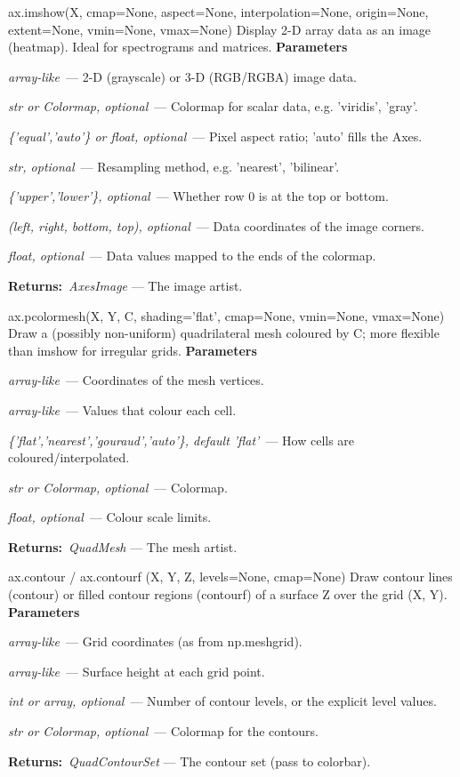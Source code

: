 \documentclass[10pt]{article}
\newenvironment{params}
  {\smallskip\textbf{\small\color{accent}Parameters}\par\nopagebreak
   \begin{description}[leftmargin=1.3em,itemsep=1.5pt,parsep=0pt,topsep=1pt,
      labelindent=0pt,style=sameline,font=\normalfont]}
  {\end{description}}
\newcommand{\pitem}[3]{\item[{\ttfamily\color{accent}#1}]{\itshape #2}\ --- #3}
\newcommand{\preturn}[2]{\smallskip\textbf{\small\color{accent}Returns:}\ {\itshape #1} --- #2\par}
\begin{document}
\begin{func}{ax.imshow(X, cmap=None, aspect=None, interpolation=None, origin=None, extent=None, vmin=None, vmax=None)}
Display 2-D array data as an image (heatmap). Ideal for spectrograms and matrices.
\begin{params}
\pitem{X}{array-like}{2-D (grayscale) or 3-D (RGB/RGBA) image data.}
\pitem{cmap}{str or Colormap, optional}{Colormap for scalar data, e.g. 'viridis', 'gray'.}
\pitem{aspect}{\{'equal','auto'\} or float, optional}{Pixel aspect ratio; 'auto' fills the Axes.}
\pitem{interpolation}{str, optional}{Resampling method, e.g. 'nearest', 'bilinear'.}
\pitem{origin}{\{'upper','lower'\}, optional}{Whether row 0 is at the top or bottom.}
\pitem{extent}{(left, right, bottom, top), optional}{Data coordinates of the image corners.}
\pitem{vmin, vmax}{float, optional}{Data values mapped to the ends of the colormap.}
\end{params}
\preturn{AxesImage}{The image artist.}
\end{func}
\medskip

\begin{func}{ax.pcolormesh(X, Y, C, shading='flat', cmap=None, vmin=None, vmax=None)}
Draw a (possibly non-uniform) quadrilateral mesh coloured by C; more flexible than imshow for irregular grids.
\begin{params}
\pitem{X, Y}{array-like}{Coordinates of the mesh vertices.}
\pitem{C}{array-like}{Values that colour each cell.}
\pitem{shading}{\{'flat','nearest','gouraud','auto'\}, default 'flat'}{How cells are coloured/interpolated.}
\pitem{cmap}{str or Colormap, optional}{Colormap.}
\pitem{vmin, vmax}{float, optional}{Colour scale limits.}
\end{params}
\preturn{QuadMesh}{The mesh artist.}
\end{func}
\medskip

\begin{func}{ax.contour / ax.contourf (X, Y, Z, levels=None, cmap=None)}
Draw contour lines (contour) or filled contour regions (contourf) of a surface Z over the grid (X, Y).
\begin{params}
\pitem{X, Y}{array-like}{Grid coordinates (as from np.meshgrid).}
\pitem{Z}{array-like}{Surface height at each grid point.}
\pitem{levels}{int or array, optional}{Number of contour levels, or the explicit level values.}
\pitem{cmap}{str or Colormap, optional}{Colormap for the contours.}
\end{params}
\preturn{QuadContourSet}{The contour set (pass to colorbar).}
\end{func}
\medskip
\end{document}
